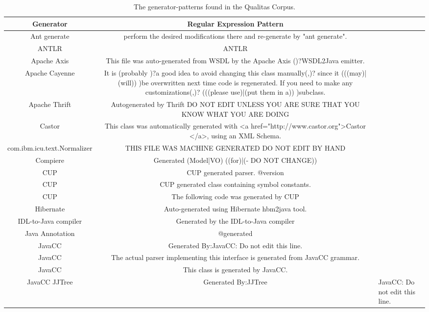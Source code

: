\setlength{\extrarowheight}{0.2em}
\begin{table}
	\caption{The generator-patterns found in the Qualitas Corpus.}
	\label{table:generatorPatternRepositoryQC}
	\begin{tabularx}{\textwidth}{c|C}
		\textbf{Generator} & \textbf{Regular Expression Pattern} \\
		\hline
		Ant generate & perform the desired modifications there and re-generate by "ant generate". \\
		ANTLR & ANTLR \version \\
		Apache Axis & This file was auto-generated from WSDL by the Apache Axis (\version \timestamp )?WSDL2Java emitter. \\
		Apache Cayenne & It is (probably )?a good idea to avoid changing this class manually(,)? since it (((may)|(will)) )be overwritten next time code is regenerated. If you need to make any customizations(,)? (((please use)|(put them in a)) )subclass. \\
		Apache Thrift & Autogenerated by Thrift DO NOT EDIT UNLESS YOU ARE SURE THAT YOU KNOW WHAT YOU ARE DOING \\
		Castor & This class was automatically generated with <a href="http://www.castor.org">Castor \version</a>, using an XML Schema. \\
		com.ibm.icu.text.Normalizer & THIS FILE WAS MACHINE GENERATED DO NOT EDIT BY HAND \\
		Compiere &  Generated (Model|VO) ((for)|(- DO NOT CHANGE)) \\
		CUP & CUP \version generated parser. @version \timestamp \\
		CUP & CUP generated class containing symbol constants. \\
		CUP & The following code was generated by CUP \\
		Hibernate & Auto-generated using Hibernate hbm2java tool. \\
		IDL-to-Java compiler & Generated by the IDL-to-Java compiler \\
		Java Annotation & @generated \\
		JavaCC & Generated By:JavaCC: Do not edit this line. \\
		JavaCC & The actual parser implementing this interface is generated from JavaCC grammar. \\
		JavaCC & This class is generated by JavaCC. \\
		JavaCC JJTree & Generated By:JJTree&JavaCC: Do not edit this line. \\

\end{tabularx}
\end{table}
